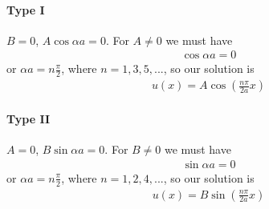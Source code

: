 {\paragraph{Type I}
\(B=0\), \(A \cos\alpha a = 0\).  For \(A \ne 0\) we must have
%
\begin{equation}\label{eqn:lecture9boundStates:120}
\begin{aligned}
\cos \alpha a = 0
\end{aligned}
\end{equation}
%
or \(\alpha a = n \frac{\pi}{2}\), where \(n = 1, 3, 5, ...\), so our solution is
%
\begin{equation}\label{eqn:PHY356Lecture9:9}
\begin{aligned}
u(x) = A \cos \left( \frac{n \pi}{2 a} x \right)
\end{aligned}
\end{equation}
%
\paragraph{Type II}
\(A=0\), \(B \sin\alpha a = 0\).  For \(B \ne 0\) we must have
%
\begin{equation}\label{eqn:lecture9boundStates:140}
\begin{aligned}
\sin \alpha a = 0
\end{aligned}
\end{equation}
%
or \(\alpha a = n \frac{\pi}{2}\), where \(n = 1, 2, 4, ...\), so our solution is
%
\begin{equation}\label{eqn:PHY356Lecture9:10}
\begin{aligned}
u(x) = B \sin \left( \frac{n \pi}{2 a} x \right)
\end{aligned}
\end{equation}
%
}
